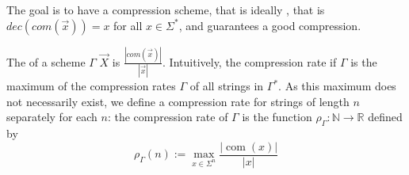 The goal is to have a compression scheme, that is ideally , that is $dec(com(\vec{x})) = x$ for all $x \in \Sigma^*$, and guarantees a good compression. 

The  of a scheme $\Gamma$ $\vec{X}$ is $\frac{|com(\vec{x})|}{|\vec{x}|}$. Intuitively, the compression rate if $\Gamma$ is the maximum of the compression rates $\Gamma$ of all strings in $\Gamma^*$. As this maximum does not necessarily exist, we define a compression rate for strings of length $n$ separately for each $n$: the compression rate of $\Gamma$ is the function \mathmarginbox{$\rho_{\Gamma}$}$\rho_{\Gamma} : \mathbb{N} \rightarrow \mathbb{R}$ defined by 
\begin{equation*}
\rho_{\Gamma}(n) :=\max _{x \in \Sigma^{n}} \frac{|\operatorname{com}(x)|}{|x|}
\end{equation*}
